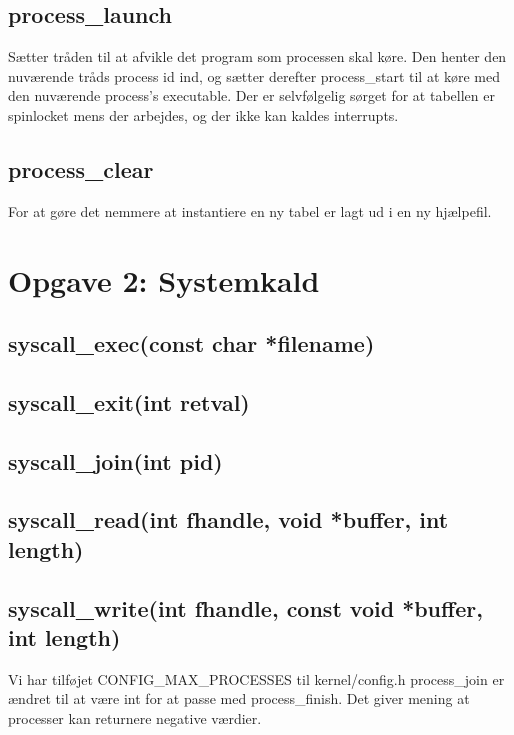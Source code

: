 \documentclass[10pt,a4paper,danish]{article}
\begin{document}
\subsection{process\_launch}
Sætter tråden til at afvikle det program som processen skal køre. Den henter den nuværende tråds process id ind, og sætter derefter process\_start til at køre med den nuværende process's executable. Der er selvfølgelig sørget for at tabellen er spinlocket mens der arbejdes, og der ikke kan kaldes interrupts.

\subsection{process\_clear}
For at gøre det nemmere at instantiere en ny tabel er lagt ud i en ny hjælpefil.

\section{Opgave 2: Systemkald}

\subsection{syscall\_exec(const char *filename)}
\subsection{syscall\_exit(int retval)}
\subsection{syscall\_join(int pid)}
\subsection{syscall\_read(int fhandle, void *buffer, int length)}
\subsection{syscall\_write(int fhandle, const void *buffer, int length)}

Vi har tilføjet CONFIG\_MAX\_PROCESSES til kernel/config.h
process\_join er ændret til at være int for at passe med process\_finish. Det giver mening at processer kan returnere negative værdier.
\end{document}
